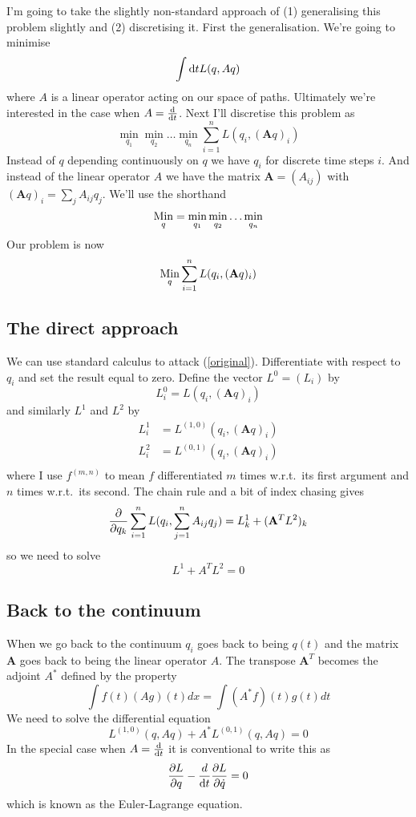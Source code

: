 \documentclass{article}
\begin{document}
\newcommand{\bA}{\mathbf{A}}
I'm going to take the slightly non-standard approach of (1) generalising this problem slightly and (2) discretising it.
First the generalisation. We're going to minimise
\[
\int\mathrm{d} tL(q,Aq)
\]
where $A$ is a linear operator acting on our space of paths.
Ultimately we're interested in the case when $A=\frac{\mathrm{d}}{\mathrm{d} t}$.
Next I'll discretise this problem as
\begin{equation*}
\min_{q_1}\min_{q_2}\ldots\min_{q_n}\sum_{i=1}^nL(q_i,(\bA q)_i)
\end{equation*}
Instead of $q$ depending continuously on $q$ we have $q_i$ for discrete time steps $i$.
And instead of the linear operator $A$ we have the matrix $\bA=(A_{ij})$ with $(\bA q)_i=\sum_jA_{ij}q_j$.
We'll use the shorthand
\begin{equation*}
\mathop{\mathrm{Min}}_q=\min_{q_1}\min_{q_2}\ldots\min_{q_n}
\end{equation*}
Our problem is now
\begin{equation}
\Min_q\sum_{i=1}^nL(q_i,(\bA q)_i)
\label{original}
\end{equation}

\subsection{The direct approach}
We can use standard calculus to attack (\ref{original}).
Differentiate with respect to $q_i$ and set the result equal to zero.
Define the vector $L^0=(L_i)$ by
\[
L^0_i=L(q_i,(\bA q)_i)
\]
and similarly $L^1$ and $L^2$ by
\begin{align*}
L^1_i &= L^{(1,0)}(q_i,(\bA q)_i)\\
L^2_i &= L^{(0,1)}(q_i,(\bA q)_i)\\
\end{align*}
where I use $f^{(m,n)}$ to mean $f$ differentiated $m$ times w.r.t.\ its first argument and $n$ times w.r.t.\ its second.
\newcommand{\pd}[1]{\frac{\partial}{\partial #1}}
The chain rule and a bit of index chasing gives
\[
\pd{q_k}\sum_{i=1}^nL(q_i,\sum_{j=1}^nA_{ij}q_j) = L^1_k+(\bA^TL^2)_k\\
\]
so we need to solve
\[
L^1+A^TL^2=0
\]

\subsection{Back to the continuum}
When we go back to the continuum $q_i$ goes back to being $q(t)$ and the matrix $\bA$ goes back to being the linear operator $A$.
The transpose $\bA ^T$ becomes the adjoint $A^\ast$
defined by the property
\[
\int f(t)(Ag)(t)dx=\int (A^\ast f)(t)g(t)dt
\]
We need to solve the differential equation
\[
L^{(1,0)}(q,Aq)+A^\ast L^{(0,1)}(q,Aq)=0
\]
In the special case when $A=\frac{\mathrm{d}}{\mathrm{d} t}$ it is conventional to write this as
\[
\frac{\partial L}{\partial q}-\frac{d}{\mathrm{d} t}\frac{\partial L}{\partial \dot{q}}=0
\]
which is known as the Euler-Lagrange equation.
\end{document}
